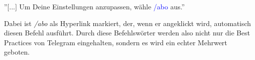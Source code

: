 ''[...] Um Deine Einstellungen anzupassen, wähle \textcolor{blue}{/abo} aus.''

Dabei ist \emph{/abo} als Hyperlink markiert, der, wenn er angeklickt wird, automatisch diesen Befehl ausführt. Durch diese Befehlswörter werden also nicht nur die Best Practices von Telegram eingehalten, sondern es wird ein echter Mehrwert geboten.
